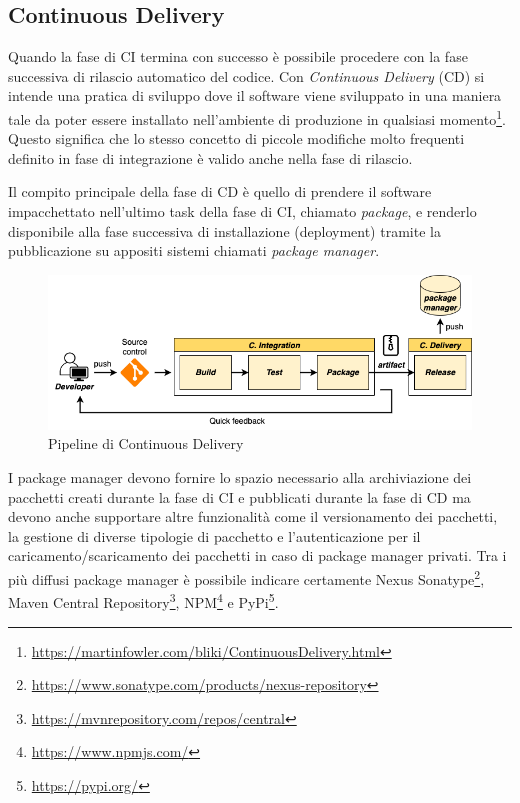 \subsection{Continuous Delivery}
\label{cd-sec}
Quando la fase di CI termina con successo è possibile procedere con la fase successiva di rilascio automatico del codice. Con \textit{Continuous Delivery} (CD) si intende una pratica di sviluppo dove il software viene sviluppato in una maniera tale da poter essere installato nell'ambiente di produzione in qualsiasi momento\footnote{\href{https://martinfowler.com/bliki/ContinuousDelivery.html}{https://martinfowler.com/bliki/ContinuousDelivery.html}}. Questo significa che lo stesso concetto di piccole modifiche molto frequenti definito in fase di integrazione è valido anche nella fase di rilascio.

Il compito principale della fase di CD è quello di prendere il software impacchettato nell'ultimo task della fase di CI, chiamato \textit{package}, e renderlo disponibile alla fase successiva di installazione (deployment) tramite la pubblicazione su appositi sistemi chiamati \textit{package manager}.

\begin{figure}[H]
    \centering
    \includegraphics[width=1\textwidth]{img/cd-pipeline.png}
    \caption{Pipeline di Continuous Delivery}
    \label{cd-pipeline}
\end{figure}

I package manager devono fornire lo spazio necessario alla archiviazione dei pacchetti creati durante la fase di CI e pubblicati durante la fase di CD ma devono anche supportare altre funzionalità come il versionamento dei pacchetti, la gestione di diverse tipologie di pacchetto e l'autenticazione per il caricamento/scaricamento dei pacchetti in caso di package manager privati. Tra i più diffusi package manager è possibile indicare certamente Nexus Sonatype\footnote{\href{https://www.sonatype.com/products/nexus-repository}{https://www.sonatype.com/products/nexus-repository}}, Maven Central Repository\footnote{\href{https://mvnrepository.com/repos/central}{https://mvnrepository.com/repos/central}}, NPM\footnote{\href{https://www.npmjs.com/}{https://www.npmjs.com/}} e PyPi\footnote{\href{https://pypi.org/}{https://pypi.org/}}.

